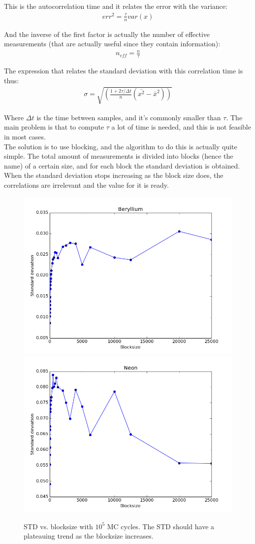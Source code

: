 \documentclass[11pt]{article}
\begin{document}
		This is the autocorrelation time and it relates the error with the variance:\\

		\begin{align}
			err^2=\frac{\tau}{n}var\left(x\right)
		\end{align}

		And the inverse of the first factor is actually the number of effective measurements (that are actually useful since they contain information):\\

		\begin{align}
			n_{eff}=\frac{n}{\tau}
		\end{align}

		The expression that relates the standard deviation with this correlation time is thus:\\

		\begin{align}
			\sigma=\sqrt{\left(\frac{1+2\tau/\Delta t}{n}\left(\bar{x^2}-\bar{x}^2\right)\right)}
		\end{align}

		Where $\Delta t$ is the time between samples, and it's commonly smaller than $\tau$. The main problem is that to compute $\tau$ a lot of time is needed, and this is not feasible in most cases.\\

					The solution is to use blocking, and the algorithm to do this is actually quite simple. The total amount of measurements is divided into blocks (hence the name) of a certain size, and for each block the standard deviation is obtained. When the standard deviation stops increasing as the block size does, the correlations are irrelevant and the value for it is ready.\\


		\begin{figure}
			\centering \includegraphics[width=0.45\linewidth]{figures/Beryllium_blocking}
			\centering \includegraphics[width=0.45\linewidth]{figures/Neon_blocking}
			\protect\caption{STD vs. blocksize with $10^{5}$ MC cycles.  The STD should have a plateauing trend as the blocksize increases.} \label{fig01:std_Stuff}

		\end{figure}
\end{document}
